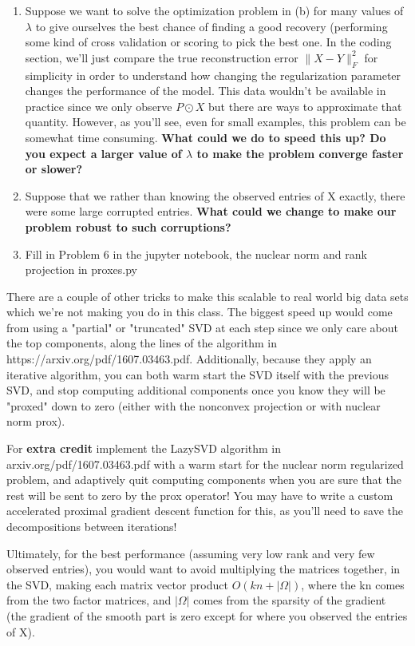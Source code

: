 \documentclass[11pt]{amsart}
\begin{document}
\begin{enumerate}
\begin{enumerate}
\item Suppose we want to solve the optimization problem in (b) for many values of $\lambda$ to give ourselves the best chance of finding a good recovery (performing some kind of cross validation or scoring to pick the best one. In the coding section, we'll just compare the true reconstruction error $\|X-Y\|_F^2$ for simplicity in order to understand how changing the regularization parameter changes the performance of the model. This data wouldn't be available in practice since we only observe $P\odot X$ but there are ways to approximate that quantity. However, as you'll see, even for small examples, this problem can be somewhat time consuming. \textbf{What could we do to speed this up? Do you expect a larger value of $\lambda$ to make the problem converge faster or slower?} 

\item Suppose that we rather than knowing the observed entries of X exactly, there were some large corrupted entries. \textbf{What could we change to make our problem robust to such corruptions?}

\item Fill in Problem 6 in the jupyter notebook, the nuclear norm and rank projection in proxes.py

\end{enumerate}
There are a couple of other tricks to make this scalable to real world big data sets which we're not making you do in this class. The biggest speed up would come from using a "partial" or "truncated" SVD at each step since we only care about the top components, along the lines of the algorithm in https://arxiv.org/pdf/1607.03463.pdf. Additionally, because they apply an iterative algorithm, you can both warm start the SVD itself with the previous SVD, and stop computing additional components once you know they will be "proxed" down to zero (either with the nonconvex projection or with nuclear norm prox).

For \textbf{extra credit} implement the LazySVD algorithm in arxiv.org/pdf/1607.03463.pdf with a warm start for the nuclear norm regularized problem, and adaptively quit computing components when you are sure that the rest will be sent to zero by the prox operator! You may have to write a custom accelerated proximal gradient descent function for this, as you'll need to save the decompositions between iterations!

Ultimately, for the best performance (assuming very low rank and very few observed entries), you would want to avoid multiplying the matrices together, in the SVD, making each matrix vector product $O(kn+|\Omega|)$, where the kn comes from the two factor matrices, and $|\Omega|$ comes from the sparsity of the gradient (the gradient of the smooth part is zero except for where you observed the entries of X).

\end{enumerate}
\end{document}
